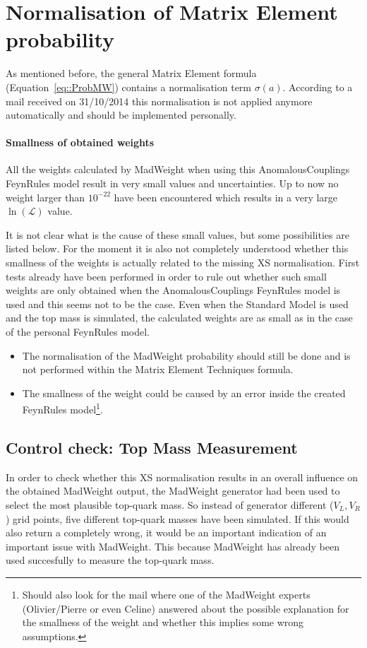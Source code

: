 \section{Normalisation of Matrix Element probability}\label{sec::MWNorm}
As mentioned before, the general Matrix Element formula (Equation~\ref{eq::ProbMW}) contains a normalisation term $\sigma(a)$. According to a mail received on 31/10/2014 this normalisation is not applied anymore automatically and should be implemented personally. 

\paragraph{Smallness of obtained weights\\}
All the weights calculated by MadWeight when using this AnomalousCouplings FeynRules model result in very small values and uncertainties. Up to now no weight larger than $10^{-22}$ have been encountered which results in a very large $\ln(\mathcal{L})$ value.

It is not clear what is the cause of these small values, but some possibilities are listed below. For the moment it is also not completely understood whether this smallness of the weights is actually related to the missing XS normalisation. First tests already have been performed in order to rule out whether such small weights are only obtained when the AnomalousCouplings FeynRules model is used and this seems not to be the case. Even when the Standard Model is used and the top mass is simulated, the calculated weights are as small as in the case of the personal FeynRules model.
\begin{itemize}
 \item The normalisation of the MadWeight probability should still be done and is not performed within the Matrix Element Techniques formula.
 \item The smallness of the weight could be caused by an error inside the created FeynRules model\footnote{Should also look for the mail where one of the MadWeight experts (Olivier/Pierre or even Celine) answered about the possible explanation for the smallness of the weight and whether this implies some wrong assumptions.}.
\end{itemize}

\subsection{Control check: Top Mass Measurement}
In order to check whether this XS normalisation results in an overall influence on the obtained MadWeight output, the MadWeight generator had been used to select the most plausible top-quark mass. So instead of generator different ($V_L, V_R$) grid points, five different top-quark masses have been simulated. If this would also return a completely wrong, it would be an important indication of an important issue with MadWeight. This because MadWeight has already been used succesfully to measure the top-quark mass.

